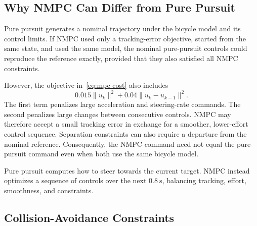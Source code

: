 \documentclass[letterpaper,10pt,conference]{ieeeconf}
\begin{document}
\subsection{Why NMPC Can Differ from Pure Pursuit}

Pure pursuit generates a nominal trajectory under the bicycle model and
its control limits. If NMPC used only a tracking-error objective, started
from the same state, and used the same model, the nominal pure-pursuit
controls could reproduce the reference exactly, provided that they also
satisfied all NMPC constraints.

However, the objective in~\eqref{eq:mpc-cost} also includes
\begin{equation}
    0.015\|u_k\|^2+0.04\|u_k-u_{k-1}\|^2.
\end{equation}
The first term penalizes large acceleration and steering-rate commands.
The second penalizes large changes between consecutive controls. NMPC
may therefore accept a small tracking error in exchange for a smoother,
lower-effort control sequence. Separation constraints can also require a
departure from the nominal reference. Consequently, the NMPC command need
not equal the pure-pursuit command even when both use the same bicycle model.

Pure pursuit computes how to steer towards the current target. NMPC instead
optimizes a sequence of controls over the next $0.8~\mathrm{s}$, balancing
tracking, effort, smoothness, and constraints.

\subsection{Collision-Avoidance Constraints}
\end{document}
